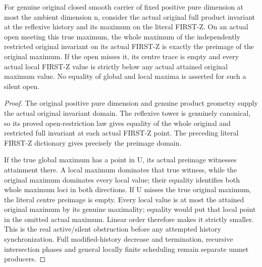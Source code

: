 \begin{theorem}
\label{hir:sharp-original-first-restricted-maximum-open-dichotomy}
\leanok
For genuine original closed smooth carrier of fixed positive pure dimension
at most the ambient dimension n, consider the
actual original full product invariant at the reflexive history and its
maximum on the literal FIRST-Z. On an actual open meeting this true maximum,
the whole maximum of the independently restricted original invariant on its
actual FIRST-Z is exactly the preimage of the original maximum. If the open
misses it, its centre trace is empty and every actual local FIRST-Z value is
strictly below any actual attained original maximum value. No equality of
global and local maxima is asserted for such a silent open.
\end{theorem}
\begin{proof}
The original positive pure dimension and genuine product geometry supply the
actual original invariant domain. The reflexive tower is genuinely canonical,
so its proved open-restriction law gives equality of the whole original and
restricted full invariant at each actual FIRST-Z point. The preceding literal
FIRST-Z dictionary gives precisely the preimage domain.

If the true global maximum has a point in U, its actual preimage witnesses
attainment there. A local maximum dominates that true witness, while the
original maximum dominates every local value; their equality identifies both
whole maximum loci in both directions. If U misses the true original maximum,
the literal centre preimage is empty. Every local value is at most the attained
original maximum by its genuine maximality; equality would put that local
point in the omitted actual maximum. Linear order therefore makes it strictly
smaller. This is the real active/silent obstruction before any attempted
history synchronization. Full modified-history decrease and termination,
recursive intersection phases and general locally finite scheduling remain
separate unmet producers.
\end{proof}
